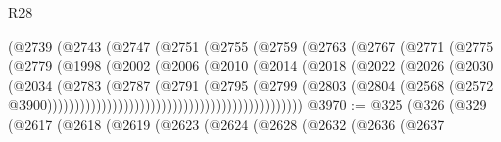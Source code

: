 \begin{lexlean}{R28}
\begin{coremodule}
                                      (@2739
                                        (@2743
                                          (@2747
                                            (@2751
                                              (@2755
                                                (@2759
                                                  (@2763
                                                    (@2767
                                                      (@2771
                                                        (@2775
                                                          (@2779
                                                            (@1998
                                                              (@2002
                                                                (@2006
                                                                  (@2010
                                                                    (@2014
                                                                      (@2018
                                                                        (@2022
                                                                          (@2026
                                                                            (@2030
                                                                              (@2034
                                                                                (@2783
                                                                                  (@2787
                                                                                    (@2791
                                                                                      (@2795
                                                                                        (@2799
                                                                                          (@2803
                                                                                            (@2804
                                                                                              (@2568
                                                                                                (@2572
                                                                                                  @3900)))))))))))))))))))))))))))))))))))))))))))))))
@3970 := @325
    (@326
      (@329
        (@2617
          (@2618
            (@2619
              (@2623
                (@2624
                  (@2628
                    (@2632
                      (@2636
                        (@2637

\end{coremodule}
\end{lexlean}
